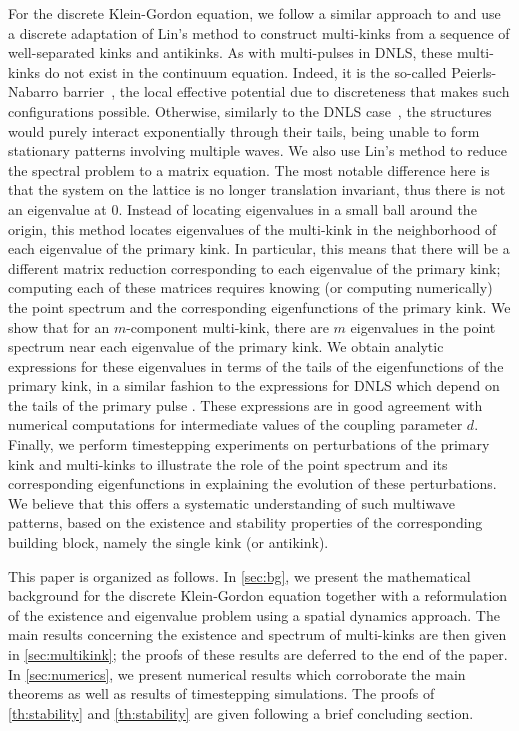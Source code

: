 \documentclass[12pt,reqno]{amsart}
\begin{document}
For the discrete Klein-Gordon equation, we follow a similar approach to \cite{Parker2020} and use a discrete adaptation of Lin's method \cite{Knobloch2000} to construct multi-kinks from a sequence of well-separated kinks and antikinks. As with multi-pulses in DNLS, these multi-kinks do not exist in the continuum equation. 
Indeed, it is the so-called Peierls-Nabarro barrier~\cite{peyrard}, the
local effective potential due to discreteness that makes
such configurations possible. Otherwise, similarly to the
DNLS case~\cite{Kapitula2001a}, the structures would purely 
interact exponentially through their tails, being unable
to form stationary patterns involving multiple waves.
We also use Lin's method to reduce the spectral problem to a matrix equation. The most notable difference here is that the system on the lattice is no longer translation invariant, thus there is not an eigenvalue at 0. Instead of locating eigenvalues in a small ball around the origin, this method locates eigenvalues of the multi-kink in the neighborhood of each eigenvalue of the primary kink. In particular, this means that there will be a different matrix reduction corresponding to each eigenvalue of the primary kink; computing each of these matrices requires knowing (or computing numerically) the point spectrum and the corresponding eigenfunctions of the primary kink. We show that for an $m$-component multi-kink, there are $m$ eigenvalues in the point spectrum near each eigenvalue of the primary kink. We obtain analytic expressions for these eigenvalues in terms of the tails of the eigenfunctions of the primary kink, in a similar fashion to the expressions for DNLS which depend on the tails of the primary pulse \cite{Parker2020}. These expressions are in good agreement with numerical computations for intermediate values of the coupling parameter $d$. Finally, we perform timestepping experiments on perturbations of the primary kink and multi-kinks to illustrate the role of the point spectrum and its corresponding eigenfunctions in explaining the evolution of these perturbations. We believe that this offers a 
systematic understanding of such multiwave patterns, based
on the existence and stability properties of the corresponding
building block, namely the single kink (or antikink).

This paper is organized as follows. In \cref{sec:bg}, we present the mathematical background for the discrete Klein-Gordon equation together with a reformulation of the existence and eigenvalue problem using a spatial dynamics approach. The main results concerning the existence and spectrum of multi-kinks are then given in \cref{sec:multikink}; the proofs of these results are deferred to the end of the paper. In \cref{sec:numerics}, we present numerical results which corroborate the main theorems as well as results of timestepping simulations. The proofs of \cref{th:stability} and \cref{th:stability} are given following a brief concluding section.
\end{document}
